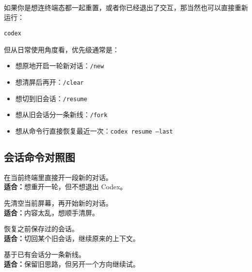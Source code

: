 \documentclass[UTF8,a4paper,12pt]{ctexart}
\begin{document}
如果你是想连终端态都一起重置，或者你已经退出了交互，那当然也可以直接重新运行：

\begin{lstlisting}[style=cli]
codex
\end{lstlisting}

但从日常使用角度看，优先级通常是：
\begin{itemize}
  \item 想原地开启一轮新对话：\texttt{/new}
  \item 想清屏后再开：\texttt{/clear}
  \item 想切到旧会话：\texttt{/resume}
  \item 想从旧会话分一条新线：\texttt{/fork}
  \item 想从命令行直接恢复最近一次：\texttt{codex resume --last}
\end{itemize}

\subsection{会话命令对照图}

\begin{center}
\begin{tcbraster}[raster columns=2, raster equal height=rows, raster column skip=6pt, raster row skip=6pt]
\begin{tcolorbox}[colback=SummaryLight, colframe=Summary, title=\texttt{/new}]
在当前终端里直接开一段新的对话。\\
\textbf{适合：}想重开一轮，但不想退出 Codex。
\end{tcolorbox}
\begin{tcolorbox}[colback=AccentLight, colframe=Accent, title=\texttt{/clear}]
先清空当前屏幕，再开始新的对话。\\
\textbf{适合：}内容太乱，想顺手清屏。
\end{tcolorbox}
\begin{tcolorbox}[colback=SummaryLight, colframe=Summary, title=\texttt{/resume}]
恢复之前保存过的会话。\\
\textbf{适合：}切回某个旧会话，继续原来的上下文。
\end{tcolorbox}
\begin{tcolorbox}[colback=AccentLight, colframe=Accent, title=\texttt{/fork}]
基于已有会话分一条新线。\\
\textbf{适合：}保留旧思路，但另开一个方向继续试。
\end{tcolorbox}
\end{tcbraster}
\end{center}
\end{document}
